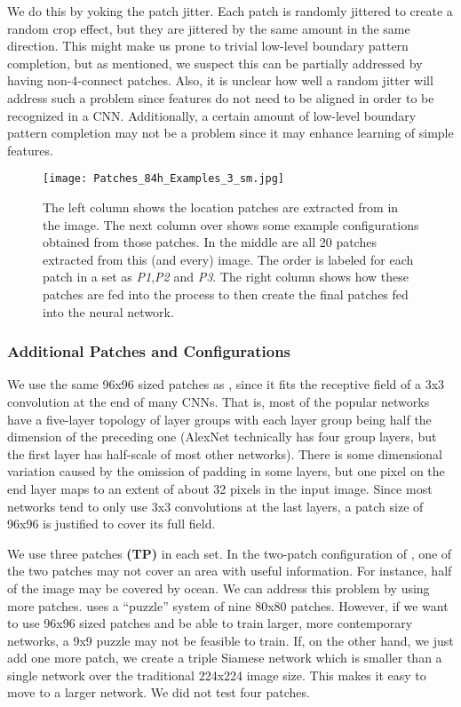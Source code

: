 \documentclass[10pt,twocolumn,letterpaper]{article}
\begin{document}
We do this by yoking the patch jitter. Each patch is randomly jittered to create a random crop effect, but they are jittered by the same amount in the same direction. This might make us prone to trivial low-level boundary pattern completion, but as mentioned, we suspect this can be partially addressed by having non-4-connect patches. Also, it is unclear how well a random jitter will address such a problem since features do not need to be aligned in order to be recognized in a CNN. Additionally, a certain amount of low-level boundary pattern completion may not be a problem since it may enhance learning of simple features. 
\begin{figure*}
\centering
\texttt{[image: Patches\_84h\_Examples\_3\_sm.jpg]}
\caption{The left column shows the location patches are extracted from in the image. The next column over shows some example configurations obtained from those patches. In the middle are all 20 patches extracted from this (and every) image. The order is labeled for each patch in a set as \emph{P1},\emph{P2} and \emph{P3}. The right column shows how these patches are fed into the process to then create the final patches fed into the neural network.}
\label{fig:patch_example}
\end{figure*}
\subsubsection{Additional Patches and Configurations}

We use the same 96x96 sized patches as \cite{Doersch15}, since it fits the receptive field of a 3x3 convolution at the end of many CNNs. That is, most of the popular networks have a five-layer topology of layer groups with each layer group being half the dimension of the preceding one \cite{GoogLeNet,ResNet,DenseNet,AlexNet,Mundhenk2016} (AlexNet technically has four group layers, but the first layer has half-scale of most other networks). There is some dimensional variation caused by the omission of padding in some layers, but one pixel on the end layer maps to an extent of about 32 pixels in the input image. Since most networks tend to only use 3x3 convolutions at the last layers, a patch size of 96x96 is justified to cover its full field.

We use three patches {\bf (TP)} in each set. In the two-patch configuration of \cite{Doersch15}, one of the two patches may not cover an area with useful information. For instance, half of the image may be covered by ocean. We can address this problem by using more patches. \cite{Noroozi16a} uses a ``puzzle'' system of nine 80x80 patches. However, if we want to use 96x96 sized patches and be able to train larger, more contemporary networks, a 9x9 puzzle may not be feasible to train. If, on the other hand, we just add one more patch, we create a triple Siamese network which is smaller than a single network over the traditional 224x224 image size. This makes it easy to move to a larger network. We did not test four patches.
\end{document}
